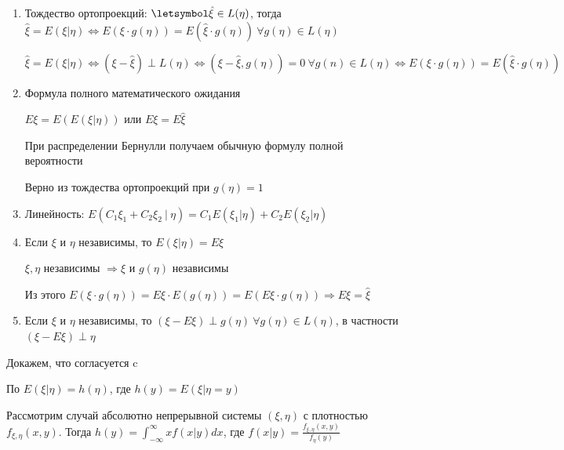 \documentclass[12pt]{article}
\begin{document}
\begin{enumerate}

    \item Тождество ортопроекций: $\letsymbol \hat{\xi} \in L(\eta)$, тогда $\hat{\xi} = E(\xi|\eta) \Longleftrightarrow E(\xi\cdot g(\eta)) = E(\hat{\xi}\cdot g(\eta)) \ \forall g(\eta) \in L(\eta)$

    \begin{MyProof}
        $\hat{\xi} = E(\xi|\eta) \Longleftrightarrow (\xi - \hat{\xi}) \perp L(\eta) \Longleftrightarrow 
        (\xi - \hat{\xi}, g(\eta)) = 0 \ \forall g(n) \in L(\eta) \Longleftrightarrow E(\xi\cdot g(\eta)) = E(\hat{\xi}\cdot g(\eta))$
    \end{MyProof}

    \item Формула полного математического ожидания

    $E\xi = E(E(\xi|\eta))$ или $E\xi = E\hat{\xi}$

    \Nota При распределении Бернулли получаем обычную формулу полной вероятности

    \begin{MyProof}
        Верно из тождества ортопроекций при $g(\eta) = 1$
    \end{MyProof}

    \item Линейность: $E(C_1\xi_1 + C_2\xi_2 \ | \ \eta) = C_1 E(\xi_1|\eta) + C_2 E(\xi_2|\eta)$

    \item Если $\xi$ и $\eta$ независимы, то $E(\xi|\eta) = E\xi$

    \begin{MyProof}
        $\xi, \eta$ независимы $\Longrightarrow \xi$ и $g(\eta)$ независимы

        Из этого $E(\xi \cdot g(\eta)) = E\xi \cdot E(g(\eta)) = E(E\xi \cdot g(\eta)) \Longrightarrow E\xi = \hat{\xi}$
    \end{MyProof}

    \item Если $\xi$ и $\eta$ независимы, то $(\xi - E\xi) \perp g(\eta) \ \forall g(\eta) \in L(\eta)$, 
    в частности $(\xi - E\xi) \perp \eta$

\end{enumerate}

Докажем, что  согласуется c 

По  $E(\xi|\eta) = h(\eta)$, где $h(y) = E(\xi|\eta = y)$

Рассмотрим случай абсолютно непрерывной системы $(\xi, \eta)$ с плотностью $f_{\xi,\eta}(x, y)$.
Тогда $h(y) = \int_{-\infty}^\infty xf(x|y)dx$, где $f(x|y) = \frac{f_{\xi,\eta}(x, y)}{f_\eta(y)}$
\end{document}
